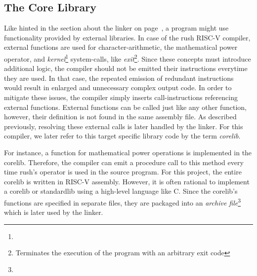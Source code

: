%
%

\subsection{The Core Library}

Like hinted in the section about the linker on page~\pageref{sec:linker},
a program might use functionality provided by external libraries.
In case of the rush RISC-V compiler, external functions are used for character-arithmetic,
the mathematical power operator, and \emph{kernel}\footnote{} system-calls,
like \emph{exit}\footnote{Terminates the execution of the program with an arbitrary exit code}.
Since these concepts must introduce additional logic, the compiler should not be emitted their instructions everytime they are used.
In that case, the repeated emission of redundant instructions would result in enlarged and unnecessary complex output code.
In order to mitigate these issues, the compiler simply inserts call-instructions referencing external functions.
External functions can be called just like any other function, however, their definition is not found in the same assembly file.
As described previously, resolving these external calls is later handled by the linker.
For this compiler, we later refer to this target specific library code by the term \emph{corelib}.

For instance, a function for mathematical power operations is implemented in the corelib.
Therefore, the compiler can emit a procedure call to this method every time rush's \qVerb{**} operator is used in the source program.
For this project, the entire corelib is written in RISC-V assembly.
However, it is often rational to implement a corelib or standardlib using a high-level language like C.
Since the corelib's functions are specified in separate files, they are packaged into an \emph{archive file}\footnote{} which is later used by the linker.

